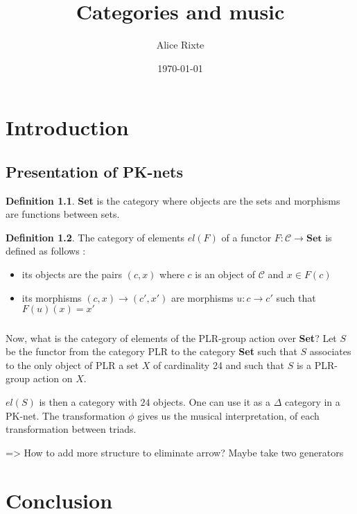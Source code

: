 \documentclass{report}
\theoremstyle{plain}
\theoremstyle{definition}
\newtheorem{defn}{Definition}[section]
\theoremstyle{remark}
\begin{document}
\title{Categories and music}
\author{Alice Rixte}
\date{\today}
\maketitle %


\chapter{Introduction}
\section{Presentation of PK-nets}
\begin{defn}\textbf{Set} is the category where objects are the sets and morphisms are functions between sets.\end{defn}


\begin{figure}[h]
    \centering
    \label{PK-net definition}
\end{figure}



\begin{defn} The category of elements $el(F)$ of a functor $F : \mathcal{C}\rightarrow \textbf{Set}$ is defined as follows :
    \begin{itemize}
        \item its objects are the pairs $(c,x)$ where $c$ is an object of $\mathcal{C}$ and $x\in F(c)$
        \item its morphisms $(c,x)\rightarrow (c',x')$ are morphisms $u : c\rightarrow c'$ such that $F(u)(x) = x'$
    \end{itemize}

  

\end{defn}

\paragraph{}
Now, what is the category of elements of the PLR-group action over \textbf{Set}? Let $S$ be the functor from the category PLR to the category \textbf{Set} such that $S$ associates to the only object of PLR a set $X$ of cardinality 24 and such that $S$ is a PLR-group action on $X$.

$el(S)$ is then a category with $24$ objects. One can use it as a $\Delta$ category in a PK-net. The transformation $\phi$ gives us the musical interpretation, of each transformation between triads.

=> How to add more structure to eliminate arrow? Maybe take two generators


\chapter{Conclusion}
\end{document}
